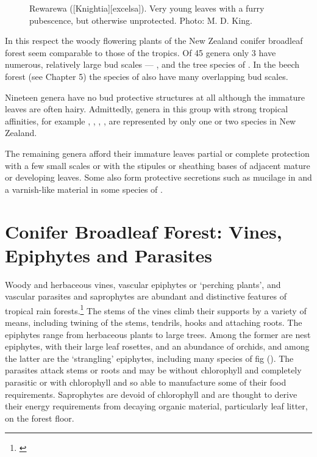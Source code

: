 \begin{figure}[htb]
\begin{minipage}[t]{0.315\textwidth}
    	\caption[Rewarewa leaves]{Rewarewa ([Knightia][excelsa]).
    	Very young leaves with a furry pubescence, but otherwise unprotected.
    	Photo: M. D. King.}%
    	\label{fig:25rewarewa}
	\end{minipage}
\end{figure}

In this respect the woody flowering plants of the New Zealand conifer broadleaf forest seem comparable to those of the tropics.
Of 45 genera only 3 have numerous, relatively large bud scales --- ,  and the tree species of .
In the beech forest (see Chapter 5) the species of  also have many overlapping bud scales.

Nineteen genera have no bud protective structures at all although the immature leaves are often hairy.
Admittedly, genera in this group with strong tropical affinities, for example , , , , are represented by only one or two species in New Zealand.

The remaining genera afford their immature leaves partial or complete protection with a few small scales or with the stipules or sheathing bases of adjacent mature or developing leaves.
Some also form protective secretions such as mucilage in  and a varnish-like material in some species of .

\chapter{Conifer Broadleaf Forest: Vines, Epiphytes and Parasites}

Woody and herbaceous vines, vascular epiphytes or `perching plants', and vascular parasites and saprophytes are abundant and distinctive features of tropical rain forests.\footnote{\cite{richards1952tropical}}
The stems of the vines climb their supports by a variety of means, including twining of the stems, tendrils, hooks and attaching roots.
The epiphytes range from herbaceous plants to large trees.
Among the former are nest epiphytes, with their large leaf rosettes, and an abundance of orchids, and among the latter are the `strangling' epiphytes, including many species of fig ().
The parasites attack stems or roots and may be without chlorophyll and completely parasitic or with chlorophyll and so able to manufacture some of their food requirements.
Saprophytes are devoid of chlorophyll and are thought to derive their energy requirements from decaying organic material, particularly leaf litter, on the forest floor.

